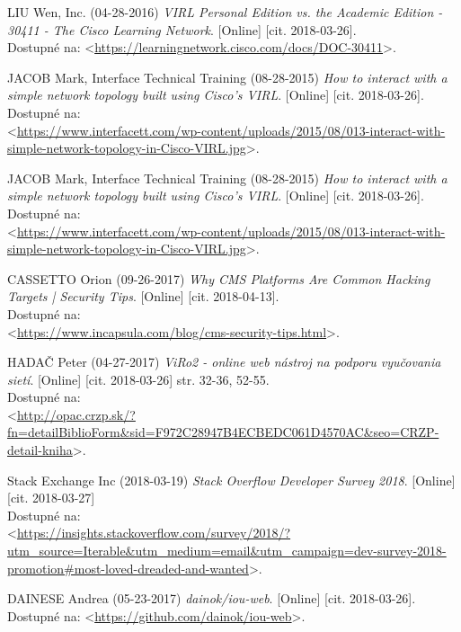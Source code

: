 \begin{thebibliography}{99}
LIU Wen, Inc. (04-28-2016) {\it VIRL Personal Edition vs. the Academic Edition - 30411 - The Cisco Learning Network}. [Online] [cit. 2018-03-26]. \\
Dostupné na: <\url{https://learningnetwork.cisco.com/docs/DOC-30411}>.

JACOB Mark, Interface Technical Training (08-28-2015) {\it How to interact with a simple network topology built using Cisco’s VIRL}. [Online] [cit. 2018-03-26]. \\
Dostupné na: \\
<\url{https://www.interfacett.com/wp-content/uploads/2015/08/013-interact-with-simple-network-topology-in-Cisco-VIRL.jpg}>.

JACOB Mark, Interface Technical Training (08-28-2015) {\it How to interact with a simple network topology built using Cisco’s VIRL}. [Online] [cit. 2018-03-26]. \\
Dostupné na: \\
<\url{https://www.interfacett.com/wp-content/uploads/2015/08/013-interact-with-simple-network-topology-in-Cisco-VIRL.jpg}>.

CASSETTO Orion (09-26-2017) {\it Why CMS Platforms Are Common Hacking Targets | Security Tips}. [Online] [cit. 2018-04-13]. \\
Dostupné na: \\
<\url{https://www.incapsula.com/blog/cms-security-tips.html}>.

HADAČ Peter (04-27-2017) {\it ViRo2 - online web nástroj na podporu vyučovania sietí}. [Online] [cit. 2018-03-26] str. 32-36, 52-55. \\
Dostupné na: \\
<\url{http://opac.crzp.sk/?fn=detailBiblioForm&sid=F972C28947B4ECBEDC061D4570AC&seo=CRZP-detail-kniha}>.

Stack Exchange Inc (2018-03-19) {\it Stack Overflow Developer Survey 2018}. [Online] [cit. 2018-03-27] \\
Dostupné na: \\
<\url{https://insights.stackoverflow.com/survey/2018/?utm_source=Iterable&utm_medium=email&utm_campaign=dev-survey-2018-promotion#most-loved-dreaded-and-wanted}>.

DAINESE Andrea (05-23-2017) {\it dainok/iou-web}. [Online] [cit. 2018-03-26]. \\
Dostupné na: <\url{https://github.com/dainok/iou-web}>.


\end{thebibliography}
